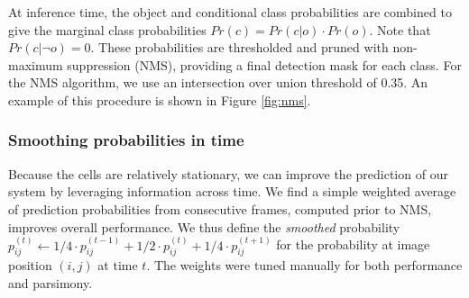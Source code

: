 
At inference time, the object and conditional class probabilities are combined to give the marginal class probabilities $Pr(c) = Pr(c | o) \cdot Pr(o)$. Note that $Pr(c | \neg o) = 0$. These probabilities are thresholded and pruned with non-maximum suppression (NMS), providing a final detection mask for each class. For the NMS algorithm, we use an intersection over union threshold of 0.35. An example of this procedure is shown in Figure \ref{fig:nms}.

\subsubsection{Smoothing probabilities in time}

Because the cells are relatively stationary, we can improve the prediction of our system by leveraging information across time. We find a simple weighted average of prediction probabilities from consecutive frames, computed prior to NMS, improves overall performance. We thus define the \emph{smoothed} probability $p_{ij}^{(t)} \leftarrow 1/4\cdot p_{ij}^{(t-1)} + 1/2\cdot p_{ij}^{(t)} + 1/4 \cdot p_{ij}^{(t+1)}$ for the probability at image position $(i, j)$ at time $t$. The weights were tuned manually for both performance and parsimony.

